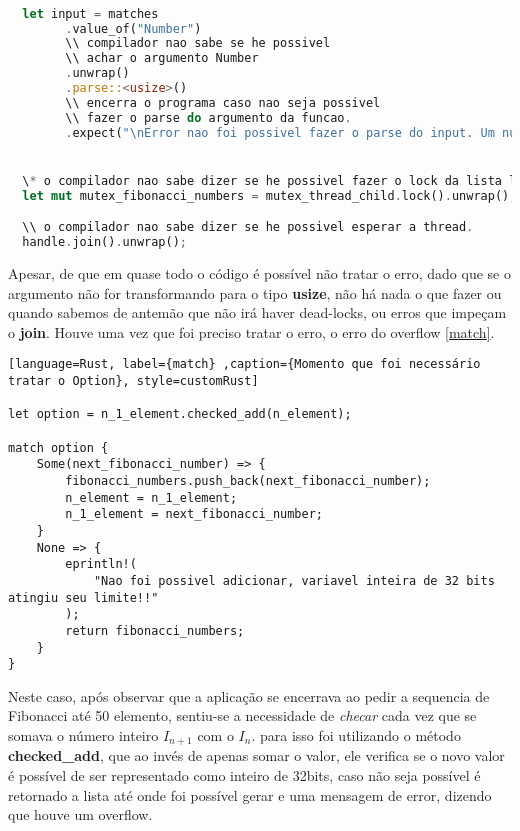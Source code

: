 \documentclass{article}
\begin{document}
\begin{lstlisting}[language=Rust, caption={Momentos que foi utilizando unwrap e expect}, style=customRust]

  let input = matches
        .value_of("Number")
        \\ compilador nao sabe se he possivel
        \\ achar o argumento Number
        .unwrap() 
        .parse::<usize>()
        \\ encerra o programa caso nao seja possivel
        \\ fazer o parse do argumento da funcao.
        .expect("\nError nao foi possivel fazer o parse do input. Um numero positivo era o esperado.\n");


  \* o compilador nao sabe dizer se he possivel fazer o lock da lista ligada */ 
  let mut mutex_fibonacci_numbers = mutex_thread_child.lock().unwrap();

  \\ o compilador nao sabe dizer se he possivel esperar a thread.
  handle.join().unwrap();

\end{lstlisting}

Apesar, de que em quase todo o código é possível não tratar o erro, dado que se
o argumento não for transformando para o tipo \textbf{usize}, não há nada o que fazer ou quando sabemos
de antemão que não irá haver dead-locks, ou erros que impeçam o \textbf{join}.
Houve uma vez que foi preciso tratar o erro, o erro do overflow \ref{match}.

\begin{lstlisting}[language=Rust, label={match} ,caption={Momento que foi necessário tratar o Option}, style=customRust]

let option = n_1_element.checked_add(n_element);

match option {
    Some(next_fibonacci_number) => {
        fibonacci_numbers.push_back(next_fibonacci_number);
        n_element = n_1_element;
        n_1_element = next_fibonacci_number;
    }
    None => {
        eprintln!(
            "Nao foi possivel adicionar, variavel inteira de 32 bits atingiu seu limite!!"
        );
        return fibonacci_numbers;
    }
}
\end{lstlisting}

Neste caso, após observar que a aplicação se encerrava ao pedir a sequencia de Fibonacci até 50 elemento,
sentiu-se a necessidade de \textit{checar} cada vez  que se somava o número inteiro $I_{n + 1}$ com o $I_{n}$.
para isso foi utilizando o método \textbf{checked\_add}, que ao invés de apenas somar o valor, ele verifica se
o novo valor é possível de ser representado como inteiro de 32bits, caso não seja possível é retornado a lista
até onde foi possível gerar e uma mensagem de error, dizendo que houve um overflow.
\end{document}
